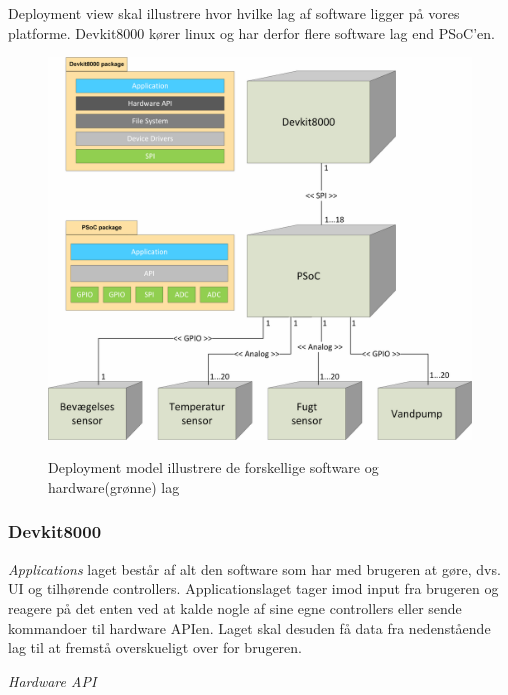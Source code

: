 
Deployment view skal illustrere hvor hvilke lag af software ligger på vores platforme. Devkit8000 kører linux og har derfor flere software lag end PSoC'en.
 
\vspace{15 mm}

\begin{figure}[htbp] \centering
{\includegraphics[scale=0.7]{filer/systemarkitektur/Deployment_model}}
\caption{Deployment model illustrere de forskellige software og hardware(grønne) lag}
\label{fig:Deployment Model}
\end{figure}

\vspace{5 mm}

\subsubsection{Devkit8000}
\textit{Applications} laget består af alt den software som har med brugeren at gøre, dvs. UI og tilhørende controllers. Applicationslaget tager imod input fra brugeren og reagere på det enten ved at kalde nogle af sine egne controllers eller sende kommandoer til hardware APIen. Laget skal desuden få data fra nedenstående lag til at fremstå overskueligt over for brugeren.

\clearpage

\textit{Hardware API}

